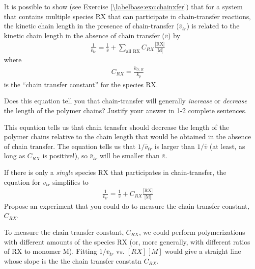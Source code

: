 \begin{activity}
\begin{infobox}
\label{\labelbase:info:vtr}

	It is possible to show (see Exercise \ref{\labelbase:exc:chainxfer}) that for a system that contains multiple species RX that can participate in chain-transfer reactions, the kinetic chain length in the presence of chain-transfer ($\bar v_{tr}$) is related to the kinetic chain length in the absence of chain transfer ($\bar v$) by
	\begin{align*}
		\frac{1}{\bar v_{tr}} = \frac{1}{\bar v} + \sum_{\text{all RX}} C_{RX}\frac{\text{[RX]}}{\text{[M]}}
	\end{align*}
	where
	\begin{align*}
		C_{RX} = \frac{k_{tr,R}}{k_p}
	\end{align*}
	is the ``chain transfer constant'' for the species RX.
	
\end{infobox}

\begin{ctqs}

	\question Does this equation tell you that chain-transfer will generally \emph{increase} or \emph{decrease} the length of the polymer chains?  Justify your answer in 1-2 complete sentences.
	
		\begin{solution}[2in]
			This equation tells us that chain transfer should decrease the length of the polymer chains relative to the chain length that would be obtained in the absence of chain transfer.  The equation tells us that $1/\bar v_{tr}$ is larger than $1/\bar v$ (at least, as long as $C_{RX}$ is positive!), so $\bar v_{tr}$ will be smaller than $\bar v$.
		\end{solution}
		
	\question If there is only a \emph{single} species RX that participates in chain-transfer, the equation for $v_{tr}$ simplifies to
	\begin{align*}
		\frac{1}{\bar v_{tr}} = \frac{1}{\bar v} + C_{RX}\frac{\text{[RX]}}{\text{[M]}}
	\end{align*}
		Propose an experiment that you could do to measure the chain-transfer constant, $C_{RX}$.
		
		\begin{solution}[2.5in]
			To measure the chain-transfer constant, $C_{RX}$, we could perform polymerizations with different amounts of the species RX (or, more generally, with different ratios of RX to monomer M).  Fitting $1/\bar v_{tr}$ vs. $[RX][M]$ would give a straight line whose slope is the the chain transfer constatn $C_{RX}$.
		\end{solution}
	

\end{ctqs}
\end{activity}
